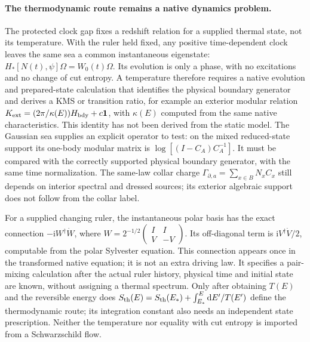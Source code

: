 \paragraph{The thermodynamic route remains a native dynamics problem.}
The protected clock gap fixes a redshift relation for a supplied thermal
state, not its temperature. With the ruler held fixed, any positive
time-dependent clock leaves the same sea a common instantaneous
eigenstate: $H_*[N(t),\psi]\Omega=W_0(t)\Omega$. Its evolution is only
a phase, with no excitations and no change of cut entropy. A temperature
therefore requires a native evolution and prepared-state calculation
that identifies the physical boundary generator and derives a KMS or
transition ratio, for example an exterior modular relation
$K_{\rm ext}=(2\pi/\kappa(E))H_{\rm bdy}+c\mathbf1$, with $\kappa(E)$
computed from the same native characteristics. This identity has not
been derived from the static model. The Gaussian sea supplies an explicit
operator to test: on the mixed reduced-state support its one-body modular
matrix is $\log[(I-C_A)C_A^{-1}]$. It must be compared with the correctly
supported physical boundary generator, with the same time normalization.
The same-law collar charge $\Gamma_{\partial,a}=\sum_{x\in B}N_xC_x$
still depends on interior spectral and dressed sources; its exterior
algebraic support does not follow from the collar label.

For a supplied changing ruler, the instantaneous polar basis has the
exact connection $-\mathrm iW^\dagger\dot W$, where
$W=2^{-1/2}\left(\begin{smallmatrix}I&I\\V&-V\end{smallmatrix}\right)$.
Its off-diagonal term is $\mathrm iV^\dagger\dot V/2$, computable from
the polar Sylvester equation. This connection appears once in the
transformed native equation; it is not an extra driving law. It specifies
a pair-mixing calculation after the actual ruler history, physical time
and initial state are known, without assigning a thermal spectrum.
Only after obtaining $T(E)$ and
the reversible energy does
$S_{\rm th}(E)=S_{\rm th}(E_*)+\int_{E_*}^{E}\mathrm dE'/T(E')$
define the thermodynamic route; its integration constant also needs an
independent state prescription. Neither the temperature nor equality
with cut entropy is imported from a Schwarzschild flow.

